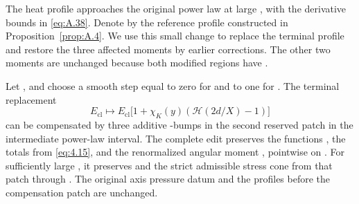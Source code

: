 %
The heat profile approaches the original power law at large , with the derivative bounds
in \eqref{eq:A.38}. Denote by  the reference profile constructed in
Proposition~\ref{prop:A.4}. We use this small change to replace the terminal profile and restore the three affected
moments by earlier corrections. The other two moments are unchanged because both modified regions have
.

\begin{proposition}\label{prop:A.7}
Let , and choose a smooth step
 equal to zero for
 and to one for . The terminal replacement
\begin{equation}
  E_{\mathrm{cl}}\longmapsto E_{\mathrm{cl}}
  \bigl[1+\chi_K(y)(\mathcal H(2d/X)-1)\bigr]
  \tag{A.39}\label{eq:A.39}
\end{equation}
can be compensated by three additive -bumps in the second reserved patch in the intermediate power-law
interval. The complete edit preserves the functions , the totals
 from \eqref{eq:4.15}, and the renormalized angular moment
, pointwise on
. For sufficiently large , it preserves
 and the strict admissible stress cone from that patch through
. The original axis pressure datum and the profiles before the compensation patch are unchanged.
\end{proposition}

